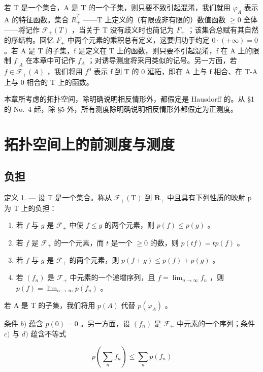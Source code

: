 若 T 是一个集合，A 是 T 的一个子集，则只要不致引起混淆，我们就用 \(\varphi_{A}\) 表示 A 的特征函数。集合 \(\overline{R}_{+}^{T}\) ——T 上定义的（有限或非有限的）数值函数 \(\geqslant0\) 全体——将记作 \(\mathcal{F}_{+}(T)\) ，当关于 T 没有歧义时也简记为 \(F_{+}\) ；该集合总赋有其自然的序结构。回忆 \(F_{+}\) 中两个元素的乘积总有定义，这要归功于约定 \(0\cdot(+\infty)=0\) 。若 A 是 T 的子集，f 是定义在 T 上的函数，则只要不引起混淆，f 在 A 上的限制 \(f|_{A}\) 在本章中可记作 \(f_{A}\) ；对诱导测度将采用类似的记号。另一方面，若 \(f\in\mathcal{F}_{+}(A)\) ，我们将用 \(f^{0}\) 表示 f 到 T 的 0 延拓，即在 A 上与 f 相合、在 T-A 上与 0 相合的 T 上的函数。

本章所考虑的拓扑空间，除明确说明相反情形外，都假定是 Hausdorff 的。从 §1 的 No.~4 起，除 §5 外，所有测度除明确说明相反情形外都假定为正测度。

\section{拓扑空间上的前测度与测度}

\subsection{负担}

定义 1. --- 设 T 是一个集合。称从 \(\mathcal{F}_{+}(\mathrm{T})\) 到 \(\overline{\mathbf{R}}_{+}\) 中且具有下列性质的映射 p 为 T 上的负担：

\begin{enumerate}
\def\labelenumi{\alph{enumi})}
\item
  若 \(f\) 与 \(g\) 是 \(\mathcal{F}_+\) 中使 \(f \leqslant g\) 的两个元素，则 \(p(f) \leqslant p(g)\) 。
\item
  若 \(f\) 是 \(\mathcal{F}_+\) 的一个元素，而 \(t\) 是一个 \(\geqslant 0\) 的数，则 \(p(tf) = tp(f)\) 。
\item
  若 \(f\) 与 \(g\) 是 \(\mathcal{F}_+\) 的两个元素，则 \(p(f + g) \leqslant p(f) + p(g)\) 。
\item
  若 \((f_n)\) 是 \(\mathcal{F}_+\) 中元素的一个递增序列，且 \(f = \lim_{n \to \infty} f_n\) ，则 \(p(f) = \lim_{n \to \infty} p(f_n)\) 。
\end{enumerate}

若 A 是 T 的子集，我们将用 \(p(A)\) 代替 \(p(\varphi_A)\) 。

条件 \(b)\) 蕴含 \(p(0) = 0\) 。另一方面，设 \((f_n)\) 是 \(\mathcal{F}_+\) 中元素的一个序列；条件 \(c)\) 与 \(d)\) 蕴含不等式

\[
p \left(\sum_ {n} f _ {n}\right) \leqslant \sum_ {n} p (f _ {n})
\]

